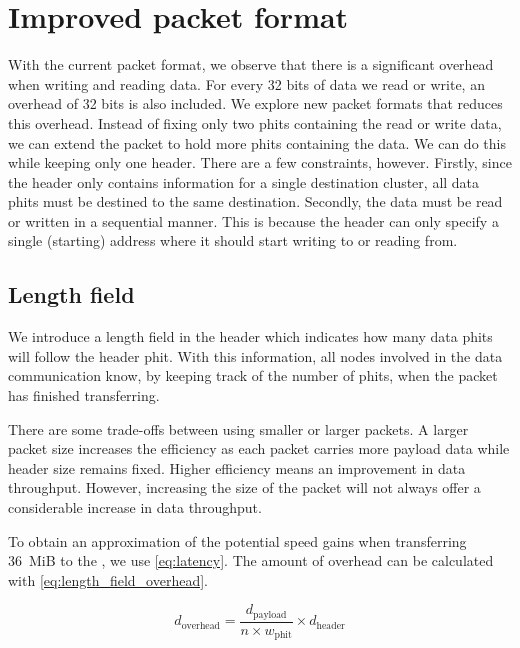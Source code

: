 \section{Improved packet format}
With the current packet format, we observe that there is a significant overhead when writing and reading data.
For every 32 bits of data we read or write, an overhead of 32 bits is also included.
We explore new packet formats that reduces this overhead.
Instead of fixing only two phits containing the read or write data, we can extend the packet to hold more phits containing the data.
We can do this while keeping only one header.
There are a few constraints, however.
Firstly, since the header only contains information for a single destination cluster, all data phits must be destined to the same destination.
Secondly, the data must be read or written in a sequential manner.
This is because the header can only specify a single (starting) address where it should start writing to or reading from.

\subsection{Length field}
We introduce a length field in the header which indicates how many data phits will follow the header phit.
With this information, all nodes involved in the data communication know, by keeping track of the number of phits, when the packet has finished transferring. 

There are some trade-offs between using smaller or larger packets.
A larger packet size increases the efficiency as each packet carries more payload data while header size remains fixed.
Higher efficiency means an improvement in data throughput.
However, increasing the size of the packet will not always offer a considerable increase in data throughput.

To obtain an approximation of the potential speed gains when transferring \SI{36}{MiB} to the \graicore{}, we use \cref{eq:latency}.
The amount of overhead can be calculated with \cref{eq:length_field_overhead}.


\begin{equation}
    d_{\textrm{overhead}} = \frac{d_{\textrm{payload}}}{n \times w_\textrm{phit}} \times d_\textrm{header}
\label{eq:length_field_overhead}
\end{equation}

